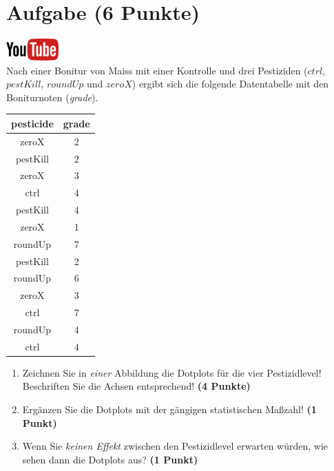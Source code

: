 \documentclass[a4paper, 10pt]{scrartcl}\usepackage[]{graphicx}\usepackage[]{xcolor}
\begin{document}
\section{Aufgabe \hfill (6 Punkte)}

\hfill\href{https://youtu.be/knAziLLQGb0}{\includegraphics[width =
  2cm]{img/youtube}}\\[1Ex]



Nach einer Bonitur von Maiss mit einer Kontrolle und drei
Pestiziden ($ctrl$, $pestKill$, $roundUp$ und $zeroX$) ergibt sich die
folgende Datentabelle mit den Boniturnoten (\textit{grade}).

\begin{table}[!h]
\centering
\begin{tabular}{cc}
\toprule
pesticide & grade\\
\midrule
zeroX & 2\\
pestKill & 2\\
zeroX & 3\\
ctrl & 4\\
pestKill & 4\\
\addlinespace
zeroX & 1\\
roundUp & 7\\
pestKill & 2\\
roundUp & 6\\
zeroX & 3\\
\addlinespace
ctrl & 7\\
roundUp & 4\\
ctrl & 4\\
\bottomrule
\end{tabular}
\end{table}



\begin{enumerate}
\item Zeichnen Sie in \textit{einer} Abbildung die Dotplots f{\"u}r die
  vier Pestizidlevel! Beschriften Sie die Achsen entsprechend!
  \textbf{(4 Punkte)}
\item Erg{\"a}nzen Sie die Dotplots mit der g{\"a}ngigen
  statistischen Ma{\ss}zahl! \textbf{(1 Punkt)}
\item Wenn Sie \textit{keinen Effekt} zwischen den Pestizidlevel erwarten
  w{\"u}rden, wie sehen dann die Dotplots aus? \textbf{(1 Punkt)}
\end{enumerate} 
\clearpage
\end{document}
